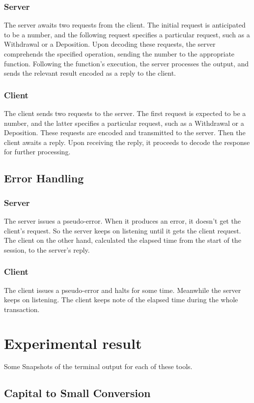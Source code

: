 \documentclass[11pt]{article}
\begin{document}
        \subsubsection{Server}
        The server awaits two requests from the client. The initial request is anticipated to be a number, and the following request specifies a particular request, such as a Withdrawal or a Deposition. Upon decoding these requests, the server comprehends the specified operation, sending the number to the appropriate function. Following the function's execution, the server processes the output, and sends the relevant result encoded as a reply to the client.
        \subsubsection{Client}
        The client sends two requests to the server. The first request is expected to be a number, and the latter specifies a particular request, such as a Withdrawal or a Deposition. These requests are encoded and transmitted to the server. Then the client awaits a reply. Upon receiving the reply, it proceeds to decode the response for further processing.
    \subsection{Error Handling}
        \subsubsection{Server}
        The server issues a pseudo-error. When it produces an error, it doesn't get the client's request. So the server keeps on listening until it gets the client request. The client on the other hand, calculated the elapsed time from the start of the session, to the server's reply.
        \subsubsection{Client}
        The client issues a pseudo-error and halts for some time. Meanwhile the server keeps on listening. The client keeps note of the elapsed time during the whole transaction.

\newpage
\section{Experimental result}

Some Snapshots of the terminal output for each of these tools.
    \subsection{Capital to Small Conversion}
\end{document}
